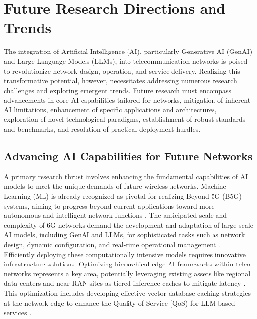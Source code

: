 \documentclass[sigconf]{acmart}
\begin{document}
\section{Future Research Directions and Trends} \label{sec:future_directions}

The integration of Artificial Intelligence (AI), particularly Generative AI (GenAI) and Large Language Models (LLMs), into telecommunication networks is poised to revolutionize network design, operation, and service delivery. Realizing this transformative potential, however, necessitates addressing numerous research challenges and exploring emergent trends. Future research must encompass advancements in core AI capabilities tailored for networks, mitigation of inherent AI limitations, enhancement of specific applications and architectures, exploration of novel technological paradigms, establishment of robust standards and benchmarks, and resolution of practical deployment hurdles.

\subsection{Advancing AI Capabilities for Future Networks}

A primary research thrust involves enhancing the fundamental capabilities of AI models to meet the unique demands of future wireless networks. Machine Learning (ML) is already recognized as pivotal for realizing Beyond 5G (B5G) systems, aiming to progress beyond current applications toward more autonomous and intelligent network functions \cite{ref1}. The anticipated scale and complexity of 6G networks demand the development and adaptation of large-scale AI models, including GenAI and LLMs, for sophisticated tasks such as network design, dynamic configuration, and real-time operational management \cite{ref2, ref13}. Efficiently deploying these computationally intensive models requires innovative infrastructure solutions. Optimizing hierarchical edge AI frameworks within telco networks represents a key area, potentially leveraging existing assets like regional data centers and near-RAN sites as tiered inference caches to mitigate latency \cite{ref3, ref31}. This optimization includes developing effective vector database caching strategies at the network edge to enhance the Quality of Service (QoS) for LLM-based services \cite{ref14}.
\end{document}
